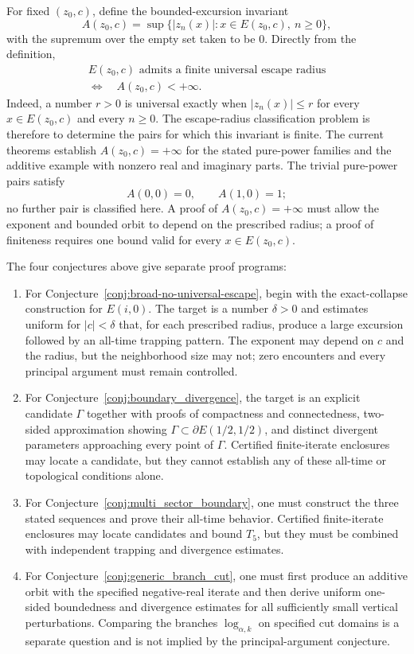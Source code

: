\documentclass[12pt,a4paper]{amsart}
\theoremstyle{remark}
\begin{document}
For fixed $(z_0,c)$, define the bounded-excursion invariant
\[
A(z_0,c)
=
\sup\{|z_n(x)|:x\in E(z_0,c),\ n\ge0\},
\]
with the supremum over the empty set taken to be $0$. Directly from the
definition,
\[
\begin{gathered}
E(z_0,c)\text{ admits a finite universal escape radius}\\
\Longleftrightarrow\quad A(z_0,c)<+\infty.
\end{gathered}
\]
Indeed, a number $r>0$ is universal exactly when $|z_n(x)|\le r$ for every
$x\in E(z_0,c)$ and every $n\ge0$. The escape-radius classification problem is
therefore to determine the pairs for which this invariant is finite. The
current theorems establish $A(z_0,c)=+\infty$ for the stated pure-power
families and the additive example with nonzero real and imaginary parts. The
trivial pure-power pairs satisfy
\[
A(0,0)=0,
\qquad
A(1,0)=1;
\]
no further pair is classified here. A proof of $A(z_0,c)=+\infty$ must allow the
exponent and bounded orbit to depend on the prescribed radius; a proof of
finiteness requires one bound valid for every $x\in E(z_0,c)$.

The four conjectures above give separate proof programs:
\begin{enumerate}
    \item For Conjecture~\ref{conj:broad-no-universal-escape}, begin with the
    exact-collapse construction for $E(i,0)$. The target is a number $\delta>0$
    and estimates uniform for $|c|<\delta$ that, for each prescribed radius,
    produce a large excursion followed by an all-time trapping pattern. The
    exponent may depend on $c$ and the radius, but the neighborhood size may not;
    zero encounters and every principal argument must remain controlled.

    \item For Conjecture~\ref{conj:boundary_divergence}, the target is an
    explicit candidate $\Gamma$ together with proofs of compactness and
    connectedness, two-sided approximation showing
    $\Gamma\subset\partial E(1/2,1/2)$, and distinct divergent parameters
    approaching every point of $\Gamma$. Certified finite-iterate enclosures may
    locate a candidate, but they cannot establish any of these all-time or
    topological conditions alone.

    \item For Conjecture~\ref{conj:multi_sector_boundary}, one must construct the
    three stated sequences and prove their all-time behavior. Certified
    finite-iterate enclosures may locate candidates and bound $T_5$, but they
    must be combined with independent trapping and divergence estimates.

    \item For Conjecture~\ref{conj:generic_branch_cut}, one must first produce an
    additive orbit with the specified negative-real iterate and then derive
    uniform one-sided boundedness and divergence estimates for all sufficiently
    small vertical perturbations. Comparing the branches $\log_{\alpha,k}$ on
    specified cut domains is a separate question and is not implied by the
    principal-argument conjecture.
\end{enumerate}
\end{document}
